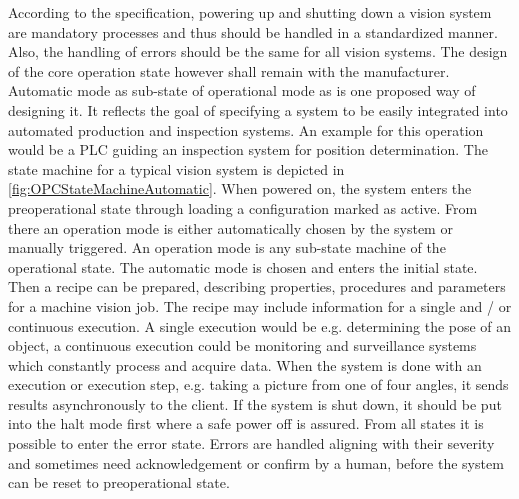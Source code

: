 According to the specification, powering up and shutting down a vision system are mandatory processes and thus should be handled in a standardized manner. Also, the handling of errors should be the same for all vision systems. The design of the core operation state however shall remain with the manufacturer. Automatic mode as sub-state of operational mode as   is one proposed way of designing it. It reflects the goal of specifying a system to be easily integrated into automated production and inspection systems. An example for this operation would be a PLC guiding an inspection system for position determination. The state machine for a typical vision system is depicted in \ref{fig:OPCStateMachineAutomatic}. When powered on, the system enters the preoperational state through loading a configuration marked as active. From there an operation mode is either automatically chosen by the system or manually triggered. An operation mode is any sub-state machine of the operational state. The automatic mode is chosen and enters the initial state. Then a recipe can be prepared, describing properties, procedures and parameters for a machine vision job. The recipe may include information for a single and / or continuous execution. A single execution would be e.g. determining the pose of an object, a continuous execution could be monitoring and surveillance systems which constantly process and acquire data. When the system is done with an execution or execution step, e.g. taking a picture from one of four angles, it sends results asynchronously to the client. If the system is shut down, it should be put into the halt mode first where a safe power off is assured. From all states it is possible to enter the error state. Errors are handled aligning with their severity and sometimes need acknowledgement or confirm by a human, before the system can be reset to preoperational state.

